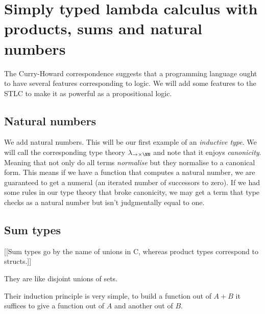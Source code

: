 \section{Simply typed lambda calculus with products, sums and natural numbers}

The Curry-Howard correspondence suggests that a programming language ought to have several features corresponding to logic. We will add some features to the STLC to make it as powerful as a propositional logic.

\subsection{Natural numbers}

We add natural numbers. This will be our first example of an \emph{inductive type}. We will call the corresponding type theory $\lambda_{\to \times \NN}$ and note that it enjoys \emph{canonicity}. Meaning that not only do all terms \emph{normalise} but they normalise to a canonical form. This means if we have a function that computes a natural number, we are guaranteed to get a numeral (an iterated number of successors to zero). If we had some rules in our type theory that broke canonicity, we may get a term that type checks as a natural number but isn't judgmentally equal to one.

\subsection{Sum types}

[[Sum types go by the name of unions in C, whereas product types correspond to structs.]]

They are like disjoint unions of sets.

Their induction principle is very simple, to build a function out of $A + B$ it suffices to give a function out of $A$ and another out of $B$.


